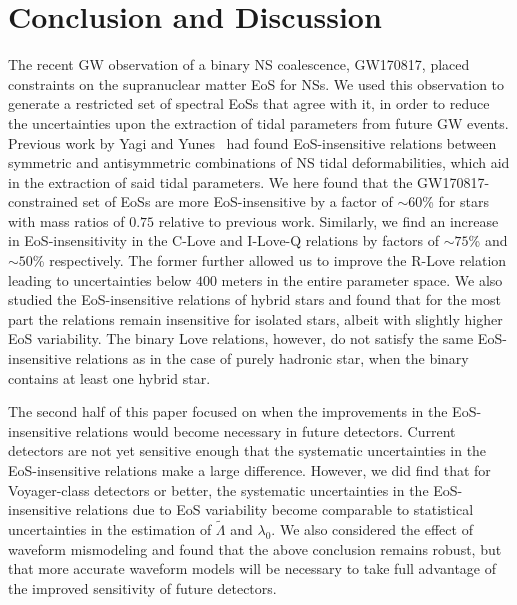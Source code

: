\documentclass[prd,twocolumn,nofootinbib,superscriptaddress,amsmath,amssymb]{revtex4-1}
\begin{document}

\section{Conclusion and Discussion}
\label{sec:conclusion}

The recent GW observation of a binary NS coalescence, GW170817, placed constraints on the supranuclear matter EoS for NSs. We used this observation to generate a restricted set of spectral EoSs that agree with it, in order to reduce the uncertainties upon the extraction of tidal parameters from future GW events. Previous work by Yagi and Yunes~\cite{Yagi:ILQ,Yagi:binLove} had found EoS-insensitive relations between symmetric and antisymmetric combinations of NS tidal deformabilities, which aid in the extraction of said tidal parameters. We here found that the GW170817-constrained set of EoSs are more EoS-insensitive by a factor of $\sim 60$\% for stars with mass ratios of $0.75$ relative to previous work. Similarly, we find an increase in EoS-insensitivity in the C-Love and I-Love-Q  relations by factors of $\sim 75$\% and $\sim 50$\% respectively. The former further allowed us to improve the R-Love relation leading to uncertainties below $400$ meters in the entire parameter space. We also studied the EoS-insensitive relations of hybrid stars and found that for the most part the relations remain insensitive for isolated stars, albeit with slightly higher EoS variability. The binary Love relations, however, do not satisfy the same EoS-insensitive relations as in the case of purely hadronic star, when the binary contains at least one hybrid star. 

The second half of this paper focused on when the improvements in the EoS-insensitive relations would become necessary in future detectors. Current detectors are not yet sensitive enough that the systematic uncertainties in the EoS-insensitive relations make a large difference. However, we did find that for Voyager-class detectors or better, the systematic uncertainties in the EoS-insensitive relations due to EoS variability become comparable to statistical uncertainties in the estimation of $\tilde{\Lambda}$ and $\lambda_{0}$. We also considered the effect of waveform mismodeling and found that the above conclusion remains robust, but that more accurate waveform models will be necessary to take full advantage of the improved sensitivity of future detectors. 
\end{document}
